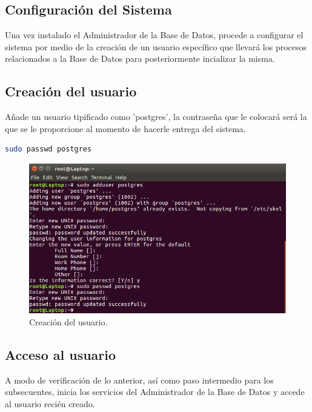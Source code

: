 \bigbreak
\subsection{Configuración del Sistema}

Una vez instalado el Administrador de la Base de Datos, procede a configurar el sistema por medio de la creación de un usuario específico que llevará los procesos relacionados a la Base de Datos para posteriormente incializar la misma.

\subsection{Creación del usuario}

Añade un usuario tipificado como 'postgres', la contraseña que le colocará será la que se le proporcione al momento de hacerle entrega del sistema.

\begin{lstlisting}[language=bash]
    sudo passwd postgres
\end{lstlisting}

\begin{figure}[H]
	\begin{center}
		\includegraphics[scale=0.35]{images/INST/6.png}
		\caption{Creación del usuario.}
	\end{center}
\end{figure}

\subsection{Acceso al usuario}

A modo de verificación de lo anterior, así como paso intermedio para los subsecuentes, inicia los servicios del Administrador de la Base de Datos y accede al usuario recién creado.

